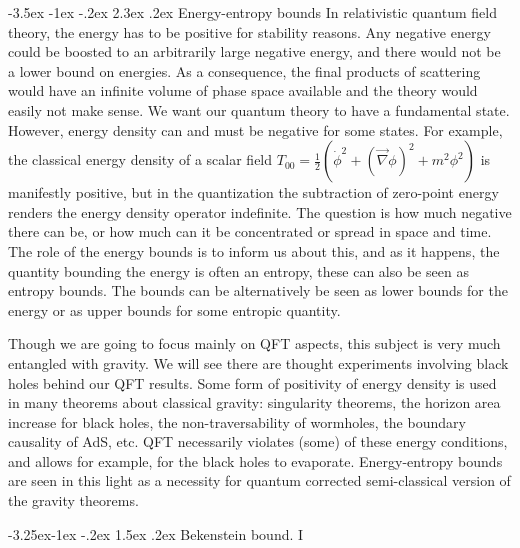 \documentclass[11pt]{article}
\makeatletter
\renewcommand\section{\@startsection {section}{1}{\z@}%
                                 {-3.5ex \@plus -1ex \@minus -.2ex}%
                                   {2.3ex \@plus.2ex}%
                                   {\normalfont\large\bfseries}}
\renewcommand\subsection{\@startsection{subsection}{2}{\z@}%
                                   {-3.25ex\@plus -1ex \@minus -.2ex}%
                                     {1.5ex \@plus .2ex}%
                                     {\normalfont\bfseries}}
\numberwithin{equation}{section}
\makeatother
\begin{document}
\section{Energy-entropy  bounds}
 In relativistic quantum field theory, the energy has to be positive for stability reasons. Any negative energy could be boosted to an arbitrarily large negative energy, and there would not be a lower bound on energies. As a consequence, the final products of scattering would have an infinite volume of phase space available and the theory would easily not make sense. We want our quantum theory to have a fundamental state. However, energy density can and must be negative for some states. For example, the classical energy density of a scalar field $T_{00}=\frac{1}{2}(\dot{\phi}^2+(\vec{\nabla} \phi)^2+m^2\phi^2)$ is manifestly positive, but in the quantization the subtraction of zero-point energy renders the energy density operator indefinite. 
  The question is how much negative there can be, or how much can it be concentrated or spread in space and time. The role of the energy bounds is to inform us about this, and as it happens, the quantity bounding the energy is often an entropy, these can also be seen as entropy bounds. The bounds can be alternatively be seen as lower bounds for the energy or as upper bounds for some entropic quantity. 
   
Though we are going to focus mainly on QFT aspects, this subject is very much entangled with gravity. We will see there are thought experiments involving black holes behind our QFT results. Some form of positivity of energy density is used in many theorems about classical gravity: singularity theorems, the horizon area increase for black holes, the non-traversability of wormholes, the boundary causality of AdS, etc. 
 QFT necessarily violates (some) of these energy conditions, and allows for example, for the black holes to evaporate. Energy-entropy bounds are seen in this light as a necessity for quantum corrected semi-classical version of the gravity theorems. 
 
   

\subsection{Bekenstein bound. I}
\end{document}

